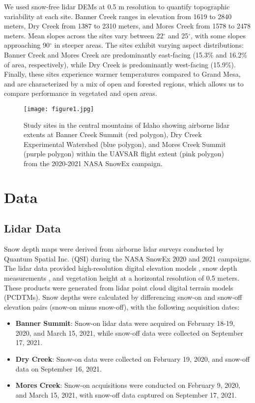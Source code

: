 \documentclass[lettersize,journal]{IEEEtran}
\begin{document}
We used snow-free lidar DEMs at 0.5 m resolution \cite{naheem2022dem} to quantify topographic variability at each site. Banner Creek ranges in elevation from 1619 to 2840 meters, Dry Creek from 1387 to 2310 meters, and Mores Creek from 1578 to 2478 meters. Mean slopes across the sites vary between 22$^\circ$ and 25$^\circ$, with some slopes approaching 90$^\circ$ in steeper areas. The sites exhibit varying aspect distributions: Banner Creek and Mores Creek are predominantly east-facing (15.3\% and 16.2\% of area, respectively), while Dry Creek is predominantly west-facing (15.9\%). Finally, these sites experience warmer temperatures compared to Grand Mesa, and are characterized by a mix of open and forested regions, which allows us to compare performance in vegetated and open areas.

\begin{figure}[!t]
  \centering
  \texttt{[image: figure1.jpg]}
  \caption{Study sites in the central mountains of Idaho showing airborne lidar extents at Banner Creek Summit (red polygon), Dry Creek Experimental Watershed (blue polygon), and Mores Creek Summit (purple polygon) within the UAVSAR flight extent (pink polygon) from the 2020-2021 NASA SnowEx campaign.}
  \label{fig-1}
  \end{figure}

\section{Data}

\subsection{Lidar Data}

Snow depth maps were derived from airborne lidar surveys conducted by Quantum Spatial Inc. (QSI) during the NASA SnowEx 2020 and 2021 campaigns. The lidar data provided high-resolution digital elevation models \cite{naheem2022dem}, snow depth measurements \cite{naheem2022sd}, and vegetation height \cite{naheem2022vh} at a horizontal resolution of 0.5 meters. These products were generated from lidar point cloud digital terrain models (PCDTMs). Snow depths were calculated by differencing snow-on and snow-off elevation pairs (snow-on minus snow-off), with the following acquisition dates:

\begin{itemize}
  \item \textbf{Banner Summit}: Snow-on lidar data were acquired on February 18-19, 2020, and March 15, 2021, while snow-off data were collected on September 17, 2021.
  \item \textbf{Dry Creek}: Snow-on data were collected on February 19, 2020, and snow-off data on September 16, 2021.
  \item \textbf{Mores Creek}: Snow-on acquisitions were conducted on February 9, 2020, and March 15, 2021, with snow-off data captured on September 17, 2021.
\end{itemize}
\end{document}
